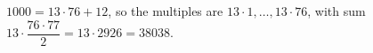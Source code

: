 $1000=13\cdot76+12$, so the multiples are $13\cdot1,\dots,13\cdot76$, with sum $13\cdot\dfrac{76\cdot77}{2}=13\cdot2926=\boxed{38038}$.
